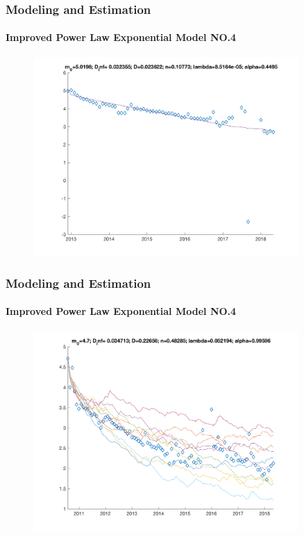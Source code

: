 \documentclass[11pt]{beamer}
\begin{document}
\begin{frame}
	\frametitle{Modeling and Estimation}
	\framesubtitle{Improved Power Law Exponential Model NO.4}
	\justifying
\begin{figure}
\begin{center}
\includegraphics[width=0.9\textwidth  ]{AAplot_21} 
\end{center}
\end{figure}				
\end{frame}	

\begin{frame}
	\frametitle{Modeling and Estimation}
	\framesubtitle{Improved Power Law Exponential Model NO.4}
	\justifying
\begin{figure}
\begin{center}
\includegraphics[width=0.9\textwidth  ]{AAplot_27} 
\end{center}
\end{figure}				
\end{frame}	
\end{document}
